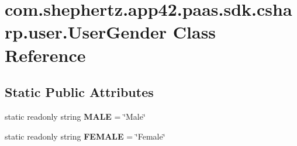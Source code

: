 \hypertarget{classcom_1_1shephertz_1_1app42_1_1paas_1_1sdk_1_1csharp_1_1user_1_1_user_gender}{\section{com.\+shephertz.\+app42.\+paas.\+sdk.\+csharp.\+user.\+User\+Gender Class Reference}
\label{classcom_1_1shephertz_1_1app42_1_1paas_1_1sdk_1_1csharp_1_1user_1_1_user_gender}
}
\subsection*{Static Public Attributes}
\begin{DoxyCompactItemize}
\item 
\hypertarget{classcom_1_1shephertz_1_1app42_1_1paas_1_1sdk_1_1csharp_1_1user_1_1_user_gender_a8d91f6d24de89e8105b0fe48b6339885}{static readonly string {\bfseries M\+A\+L\+E} = \char`\"{}Male\char`\"{}}\label{classcom_1_1shephertz_1_1app42_1_1paas_1_1sdk_1_1csharp_1_1user_1_1_user_gender_a8d91f6d24de89e8105b0fe48b6339885}

\item 
\hypertarget{classcom_1_1shephertz_1_1app42_1_1paas_1_1sdk_1_1csharp_1_1user_1_1_user_gender_ae2663799a01210b7be897f22297c78ff}{static readonly string {\bfseries F\+E\+M\+A\+L\+E} = \char`\"{}Female\char`\"{}}\label{classcom_1_1shephertz_1_1app42_1_1paas_1_1sdk_1_1csharp_1_1user_1_1_user_gender_ae2663799a01210b7be897f22297c78ff}

\end{DoxyCompactItemize}
